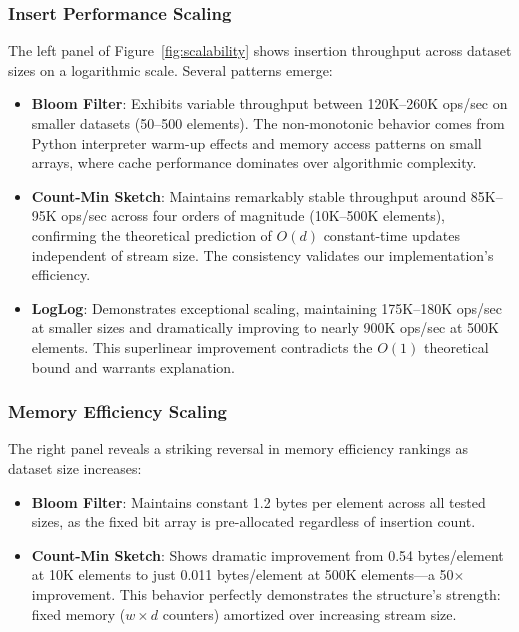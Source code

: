 \subsubsection{Insert Performance Scaling}

The left panel of Figure~\ref{fig:scalability} shows insertion throughput across dataset sizes on a logarithmic scale. Several patterns emerge:

\begin{itemize}
    \item \textbf{Bloom Filter}: Exhibits variable throughput between 120K--260K ops/sec on smaller datasets (50--500 elements). The non-monotonic behavior comes from Python interpreter warm-up effects and memory access patterns on small arrays, where cache performance dominates over algorithmic complexity.

    \item \textbf{Count-Min Sketch}: Maintains remarkably stable throughput around 85K--95K ops/sec across four orders of magnitude (10K--500K elements), confirming the theoretical prediction of $O(d)$ constant-time updates independent of stream size. The consistency validates our implementation's efficiency.

    \item \textbf{LogLog}: Demonstrates exceptional scaling, maintaining 175K--180K ops/sec at smaller sizes and dramatically improving to nearly 900K ops/sec at 500K elements. This superlinear improvement contradicts the $O(1)$ theoretical bound and warrants explanation.
\end{itemize}

\subsubsection{Memory Efficiency Scaling}

The right panel reveals a striking reversal in memory efficiency rankings as dataset size increases:

\begin{itemize}
    \item \textbf{Bloom Filter}: Maintains constant 1.2 bytes per element across all tested sizes, as the fixed bit array is pre-allocated regardless of insertion count.

    \item \textbf{Count-Min Sketch}: Shows dramatic improvement from 0.54 bytes/element at 10K elements to just 0.011 bytes/element at 500K elements---a 50$\times$ improvement. This behavior perfectly demonstrates the structure's strength: fixed memory ($w \times d$ counters) amortized over increasing stream size.
\end{itemize}

